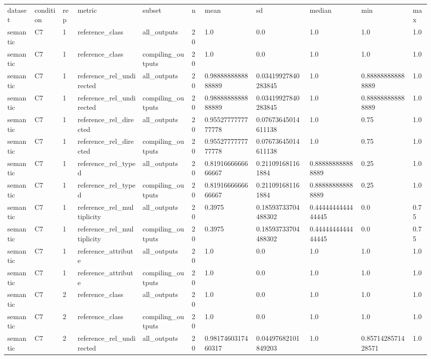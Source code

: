 \begin{tabular}{lllllllllll}
dataset & condition & rep & metric & subset & n & mean & sd & median & min & max \\
semantic & C7 & 1 & reference\_class & all\_outputs & 20 & 1.0 & 0.0 & 1.0 & 1.0 & 1.0 \\
semantic & C7 & 1 & reference\_class & compiling\_outputs & 20 & 1.0 & 0.0 & 1.0 & 1.0 & 1.0 \\
semantic & C7 & 1 & reference\_rel\_undirected & all\_outputs & 20 & 0.9888888888888889 & 0.03419927840283845 & 1.0 & 0.888888888888889 & 1.0 \\
semantic & C7 & 1 & reference\_rel\_undirected & compiling\_outputs & 20 & 0.9888888888888889 & 0.03419927840283845 & 1.0 & 0.888888888888889 & 1.0 \\
semantic & C7 & 1 & reference\_rel\_directed & all\_outputs & 20 & 0.9552777777777778 & 0.07673645014611138 & 1.0 & 0.75 & 1.0 \\
semantic & C7 & 1 & reference\_rel\_directed & compiling\_outputs & 20 & 0.9552777777777778 & 0.07673645014611138 & 1.0 & 0.75 & 1.0 \\
semantic & C7 & 1 & reference\_rel\_typed & all\_outputs & 20 & 0.8191666666666667 & 0.211091681161884 & 0.888888888888889 & 0.25 & 1.0 \\
semantic & C7 & 1 & reference\_rel\_typed & compiling\_outputs & 20 & 0.8191666666666667 & 0.211091681161884 & 0.888888888888889 & 0.25 & 1.0 \\
semantic & C7 & 1 & reference\_rel\_multiplicity & all\_outputs & 20 & 0.3975 & 0.18593733704488302 & 0.4444444444444445 & 0.0 & 0.75 \\
semantic & C7 & 1 & reference\_rel\_multiplicity & compiling\_outputs & 20 & 0.3975 & 0.18593733704488302 & 0.4444444444444445 & 0.0 & 0.75 \\
semantic & C7 & 1 & reference\_attribute & all\_outputs & 20 & 1.0 & 0.0 & 1.0 & 1.0 & 1.0 \\
semantic & C7 & 1 & reference\_attribute & compiling\_outputs & 20 & 1.0 & 0.0 & 1.0 & 1.0 & 1.0 \\
semantic & C7 & 2 & reference\_class & all\_outputs & 20 & 1.0 & 0.0 & 1.0 & 1.0 & 1.0 \\
semantic & C7 & 2 & reference\_class & compiling\_outputs & 20 & 1.0 & 0.0 & 1.0 & 1.0 & 1.0 \\
semantic & C7 & 2 & reference\_rel\_undirected & all\_outputs & 20 & 0.9817460317460317 & 0.04497682101849203 & 1.0 & 0.8571428571428571 & 1.0 \\

\end{tabular}
